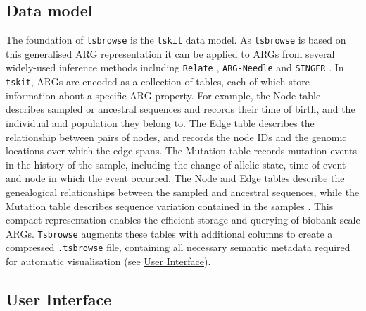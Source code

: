 \documentclass[unnumsec,webpdf,contemporary,large,namedate]{oup-authoring-template}%
\begin{document}
\subsection{Data model} \label{subsec:Data_Model} The foundation of
\texttt{tsbrowse} is the \texttt{tskit} data model. As \texttt{tsbrowse} is
based on this generalised ARG representation \citep{wong2024general} it can be applied
to ARGs from several widely-used inference methods including \texttt{Relate}
\citep{speidel2019method}, \texttt{ARG-Needle} \citep{zhang2023biobank} 
and \texttt{SINGER} \citep{deng2024robust}. In \texttt{tskit}, ARGs are encoded as a
collection of tables, each of which store information about a specific ARG
property. For example, the Node table describes sampled or ancestral sequences
and records their time of birth, and the individual and population they belong
to. The Edge table describes the relationship between pairs of nodes, and
records the node IDs and the genomic locations over which the edge spans. The
Mutation table records mutation events in the history of the sample, including
the change of allelic state, time of event and node in which the event
occurred. The Node and Edge tables describe the genealogical relationships
between the sampled and ancestral sequences, while the Mutation table describes
sequence variation contained in the samples \citep{Ralph2020}. This compact
representation enables the efficient storage and querying of biobank-scale
ARGs. \texttt{Tsbrowse} augments these tables with additional columns to create
a compressed \texttt{.tsbrowse} file, containing all necessary semantic
metadata required for automatic visualisation (see
\hyperref[subsec:User_Interface]{User Interface}). 

\subsection{User Interface}
\label{subsec:User_Interface}
\end{document}

